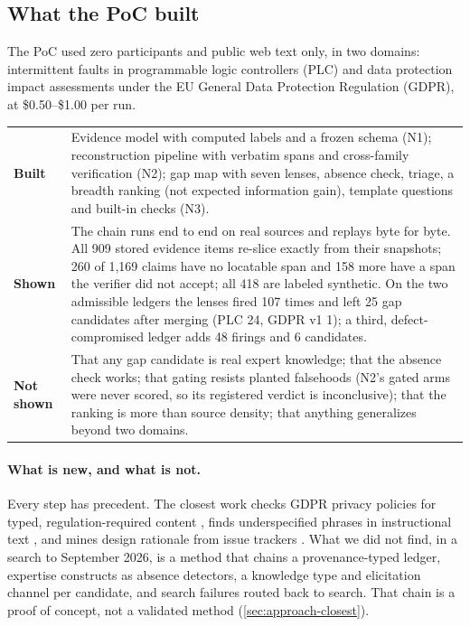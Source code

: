\subsection*{What the PoC built}

\evobs{} The PoC used zero participants and public web text only, in two domains: intermittent
faults in programmable logic controllers (PLC) and data protection impact assessments under the EU General Data Protection Regulation
(GDPR), at
\$0.50--\$1.00 per run.

\begingroup
  \footnotesize\noindent
  \begin{tabularx}{\linewidth}{@{}>{\bfseries}p{2.1cm}X@{}}
    \toprule
    Built & Evidence model with computed labels and a frozen schema (N1); reconstruction pipeline
      with verbatim spans and cross-family verification (N2); gap map with seven lenses, absence
      check, triage, a breadth ranking (not expected information gain), template questions and
      built-in checks (N3). \\
    Shown & The chain runs end to end on real sources and replays byte for byte. All 909 stored
      evidence items re-slice exactly from their snapshots; 260 of 1,169 claims have no locatable span and 158 more have a span the verifier did not accept; all 418 are labeled synthetic. On the two admissible ledgers the lenses fired 107 times and
      left 25 gap candidates after merging (PLC 24, GDPR v1 1); a third, defect-compromised ledger
      adds 48 firings and 6 candidates. \\
    Not shown & That any gap candidate is real expert knowledge; that the absence check works; that
      gating resists planted falsehoods (N2's gated arms were never scored, so its registered verdict
      is inconclusive); that the ranking is more than source density; that anything generalizes
      beyond two domains. \\
    \bottomrule
  \end{tabularx}
\endgroup

\paragraph{What is new, and what is not.} \evint{} Every step has precedent. The closest work checks
GDPR privacy policies for typed, regulation-required content \parencite{torre2020ai}, finds
underspecified phrases in instructional text \parencite{anthonio2022clarifying}, and mines design
rationale from issue trackers \parencite{zhao2024drminer}. What we did not find, in a search to
September 2026, is a method that chains a provenance-typed ledger, expertise constructs as absence
detectors, a knowledge type and elicitation channel per candidate, and search failures routed back
to search. That chain is a proof of concept, not a validated method (\cref{sec:approach-closest}).

